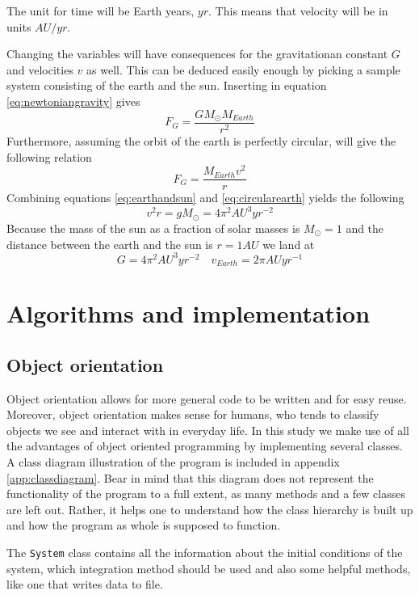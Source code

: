 \documentclass[10pt,a4paper]{amsart}
\begin{document}
The unit for time will be Earth years, $yr$. This means that velocity will be in units $AU/yr$.

Changing the variables will have consequences for the gravitationan constant $G$ and velocities $v$ as well. This can be deduced easily enough by picking a sample system consisting of the earth and the sun. Inserting in equation \ref{eq:newtoniangravity} gives
\begin{equation}
\label{eq:earthandsun}
F_G = \frac{GM_{\odot}M_{Earth}}{r^2}
\end{equation}
Furthermore, assuming the orbit of the earth is perfectly circular, will give the following relation
\begin{equation}
\label{eq:circularearth}
F_G = \frac{M_{Earth}v^2}{r}
\end{equation}
Combining equations \ref{eq:earthandsun} and \ref{eq:circularearth} yields the following
\begin{equation}
v^2r=gM_{\odot}=4\pi^2AU^3yr^{-2}
\end{equation}
Because the mass of the sun as a fraction of solar masses is $M_{\odot}=1$  and the distance between the earth and the sun is $r=1AU$ we land at
\begin{equation}
G=4\pi^2AU^3yr^{-2} \quad v_{Earth}=2\pi AUyr^{-1}
\end{equation}

\section{Algorithms and implementation}

\subsection{Object orientation}
Object orientation allows for more general code to be written and for easy reuse. Moreover, object orientation makes sense for humans, who tends to classify objects we see and interact with in everyday life. In this study we make use of all the advantages of object oriented programming by implementing several classes. A class diagram illustration of the program is included in appendix \ref{app:classdiagram}. Bear in mind that this diagram does not represent the functionality of the program to a full extent, as many methods and a few classes are left out. Rather, it helps one to understand how the class hierarchy is built up and how the program as whole is supposed to function.

The \lstinline|System| class contains all the information about the initial conditions of the system, which integration method should be used and also some helpful methods, like one that writes data to file.
\end{document}
